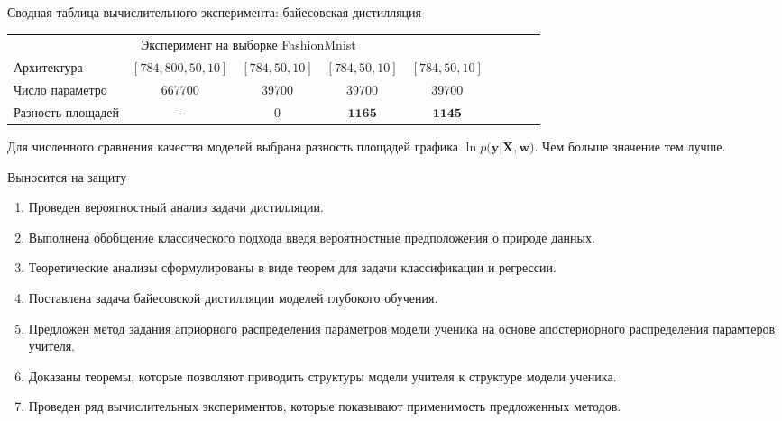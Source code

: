 \documentclass[10pt,pdf,hyperref={unicode}]{beamer}
\begin{document}
\begin{frame}{Сводная таблица вычислительного эксперимента: байесовская дистилляция}
\begin{table}[]
\begin{center}
{\begin{tabular}{|l|c|c|c|c|llll}
\multicolumn{5}{|c|}{Эксперимент на выборке FashionMnist}                                                     &                      &                      &                      &                      \\ \cline{1-5}
Архитектура           & $[784,800,50,10]$& $[784,50,10]$   & $[784,50,10]$  & $[784,50,10]$      &                      &                      &                      &                      \\ \cline{1-5}
Число параметро    &   667700                     &     39700                     &      39700                   &      39700                       &                      &                      &                      &                      \\ \cline{1-5}
Разность площадей   & -                           & 0                       &  $\mathbf{1165}$               & $\mathbf{1145} $                   &                      &                      &                      &                      \\ \cline{1-5}
\end{tabular}
}
\end{center}
\end{table}

Для численного сравнения качества моделей выбрана разность площадей графика $\ln p\bigr(\mathbf{y}|\mathbf{X}, \mathbf{w}\bigr)$. Чем больше значение тем лучше.

\end{frame}

\begin{frame}{Выносится на защиту}
\justifying
	\begin{enumerate}
	\justifying
		\item Проведен вероятностный анализ задачи дистилляции.
		\item Выполнена обобщение классического подхода введя вероятностные предположения о природе данных.
		\item Теоретические анализы сформулированы в виде теорем для задачи классификации и регрессии.
		\item Поставлена задача байесовской дистилляции моделей глубокого обучения.
		\item Предложен метод задания априорного распределения параметров модели ученика на основе апостериорного распределения парамтеров учителя.
		\item Доказаны теоремы, которые позволяют приводить структуры модели учителя к структуре модели ученика.
		\item Проведен ряд вычислительных экспериментов, которые показывают применимость предложенных методов.
	\end{enumerate}

\end{frame}
\end{document}
